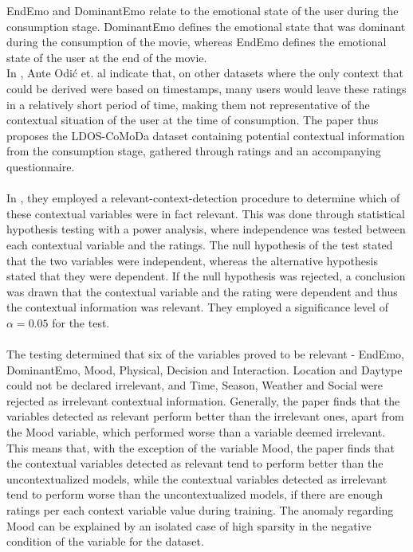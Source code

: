 EndEmo and DominantEmo relate to the emotional state of the user during the consumption stage.
DominantEmo defines the emotional state that was dominant during the consumption of the movie, whereas EndEmo defines the emotional state of the user at the end of the movie\cite{COMODA2013}.\\
In \cite{COMODA2013}, Ante Odić et. al indicate that, on other datasets where the only context that could be derived were based on timestamps, many users would leave these ratings in a relatively short period of time, making them not representative of the contextual situation of the user at the time of consumption.
The paper thus proposes the LDOS-CoMoDa dataset containing potential contextual information from the consumption stage, gathered through ratings and an accompanying questionnaire.
\\\\
In \cite{COMODA2013}, they employed a relevant-context-detection procedure to determine which of these contextual variables were in fact relevant.
This was done through statistical hypothesis testing with a power analysis, where independence was tested between each contextual variable and the ratings.
The null hypothesis of the test stated that the two variables were independent, whereas the alternative hypothesis stated that they were dependent.
If the null hypothesis was rejected, a conclusion was drawn that the contextual variable and the rating were dependent and thus the contextual information was relevant.
They employed a significance level of $\alpha = 0.05$ for the test.
\\\\
The testing determined that six of the variables proved to be relevant - EndEmo, DominantEmo, Mood, Physical, Decision and Interaction.
Location and Daytype could not be declared irrelevant, and Time, Season, Weather and Social were rejected as irrelevant contextual information.
Generally, the paper finds that the variables detected as relevant perform better than the irrelevant ones, apart from the Mood variable, which performed worse than a variable deemed irrelevant.
This means that, with the exception of the variable Mood, the paper finds that the contextual variables detected as relevant tend to perform better than the uncontextualized models, while the contextual variables detected as irrelevant tend to perform worse than the uncontextualized models, if there are enough ratings per each context variable value during training.
The anomaly regarding Mood can be explained by an isolated case of high sparsity in the negative condition of the variable for the dataset.

